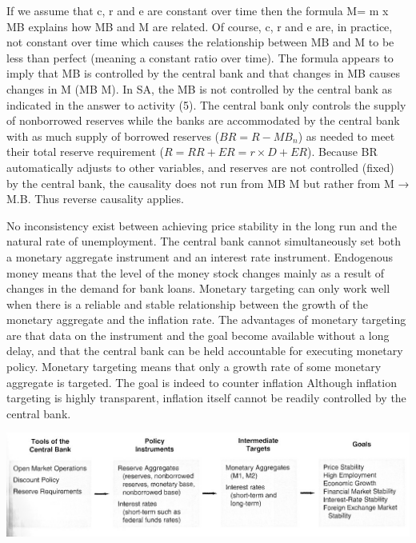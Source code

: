\documentclass[12pt]{examnotes}
\begin{document}
\ra If we assume that c, r and e are constant over time then the formula M= m x MB explains how MB and M are related. Of course, c, r and e are, in practice, not constant over time which causes the relationship between MB and M to be less than perfect (meaning a constant ratio over time).
\ra The formula appears to imply that MB is controlled by the central bank and that changes in MB causes changes in M (MB \ra  M). In SA, the MB is not controlled by the central bank as indicated in the answer to activity (5). The central bank only controls the supply of nonborrowed reserves while the banks are accommodated by the central bank with as much supply of borrowed reserves ($BR=R-MB_n$) as needed to meet their total reserve requirement ($R=RR+ER = r \times D+ER$). Because BR automatically adjusts to other variables, and reserves are not controlled (fixed) by the central bank, the causality does not run from MB \ra  M but rather from M → M.B. Thus reverse causality applies.


\ra No inconsistency exist between achieving price stability in the long run and the natural rate of unemployment.
\ra The central bank cannot simultaneously set both a monetary aggregate instrument and an interest
rate instrument.
\ra Endogenous money means that the level of the money stock changes mainly as a result of
changes in the demand for bank loans.
\ra Monetary targeting can only work well when there is a reliable and stable relationship between the
growth of the monetary aggregate and the inflation rate.
\ra The advantages of monetary targeting are that data on the instrument and the goal become available without a long delay, and that the central bank can be held accountable for executing
monetary policy.
\ra Monetary targeting means that only a growth rate of some monetary aggregate is targeted. The goal is indeed to counter inflation
\ra Although inflation targeting is highly transparent, inflation itself cannot be readily controlled by the central bank.

\includegraphics[scale=0.5]{./imgs/171.jpg}
\end{document}
